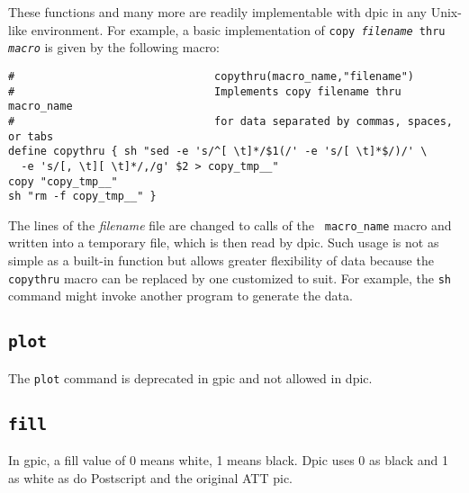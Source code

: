 \documentclass[11pt]{article}
\newcommand{\bq}{}
\newcommand{\Postscript}{{\bq Postscript}\xspace}
\newcommand{\dpic}{{\bq dpic}\xspace}
\newcommand{\ntt}[1]{\\\hbox{}\quad{\tt #1}}
\begin{document}
  These functions and many more are readily implementable with dpic in any
  Unix-like environment.
%
%
%
For example, a basic implementation of
{\tt copy {\sl filename} thru {\sl macro}}
is given by the following macro:
\begin{verbatim}
#                               copythru(macro_name,"filename")
#                               Implements copy filename thru macro_name 
#                               for data separated by commas, spaces, or tabs
define copythru { sh "sed -e 's/^[ \t]*/$1(/' -e 's/[ \t]*$/)/' \
  -e 's/[, \t][ \t]*/,/g' $2 > copy_tmp__"
copy "copy_tmp__"
sh "rm -f copy_tmp__" }
\end{verbatim}
The lines of the {\sl filename} file are changed to calls of the {\tt
macro\_name} macro and written into a temporary file, which is then
read by \dpic.  Such usage is not as simple as a built-in function but
allows greater flexibility of data because the {\tt copythru}
macro can be replaced by one customized to suit. For example, the {\tt sh}
command might invoke another program to generate the data.

\subsection{{\tt plot}}
  The {\tt plot} command is deprecated in gpic and not allowed in dpic.

\subsection{{\tt fill}}
  In gpic, a fill value of 0 means white, 1 means black.
  Dpic uses 0 as black and 1 as
  white as do \Postscript and the original ATT pic.
\end{document}
